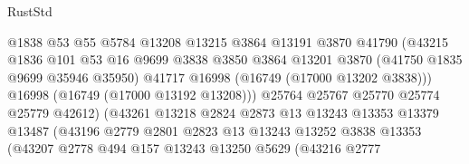 \begin{lexlean}{RustStd}
\begin{coremodule}
                                    @1838
                                    @53
                                    @55
                                    @5784
                                    @13208
                                    @13215
                                    @3864
                                    @13191
                                    @3870
                                    @41790
                                    (@43215
                                      @1836
                                      @101
                                      @53
                                      @16
                                      @9699
                                      @3838
                                      @3850
                                      @3864
                                      @13201
                                      @3870
                                      (@41750 @1835 @9699 @35946 @35950)
                                      @41717
                                      @16998
                                      (@16749 (@17000 @13202 @3838)))
                                    @16998
                                    (@16749 (@17000 @13192 @13208)))
                                  @25764
                                  @25767
                                  @25770
                                  @25774
                                  @25779
                                  @42612)
                                (@43261
                                  @13218
                                  @2824
                                  @2873
                                  @13
                                  @13243
                                  @13353
                                  @13379
                                  @13487
                                  (@43196
                                    @2779
                                    @2801
                                    @2823
                                    @13
                                    @13243
                                    @13252
                                    @3838
                                    @13353
                                    (@43207
                                      @2778
                                      @494
                                      @157
                                      @13243
                                      @13250
                                      @5629
                                      (@43216
                                        @2777

\end{coremodule}
\end{lexlean}
